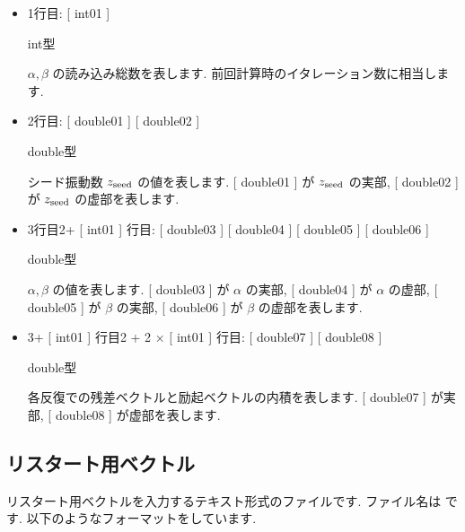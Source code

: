 \documentclass[letterpaper,10pt,dvipdfmx,openany]{sphinxmanual}
\begin{document}
\begin{sphinxVerbatim}[commandchars=\\\{\}]
 
    
   
 
 
\end{sphinxVerbatim}
\begin{itemize}
\item {} 
1行目: {[} int01 {]}

 int型

\(\alpha, \beta\) の読み込み総数を表します. 前回計算時のイタレーション数に相当します.

\item {} 
2行目: {[} double01 {]} {[} double02 {]}

 double型

 シード振動数 \(z_{\rm seed}\) の値を表します.
{[} double01 {]} が \(z_{\rm seed}\) の実部,
{[} double02 {]} が \(z_{\rm seed}\) の虚部を表します.

\item {} 
3行目\sphinxhyphen{}2+ {[} int01 {]} 行目:
{[} double03 {]} {[} double04 {]} {[} double05 {]} {[} double06 {]}

 double型

 \(\alpha, \beta\) の値を表します.
{[} double03 {]} が \(\alpha\) の実部, {[} double04 {]} が \(\alpha\) の虚部,
{[} double05 {]} が \(\beta\) の実部, {[} double06 {]} が \(\beta\) の虚部を表します.

\item {} 
3+ {[} int01 {]} 行目\sphinxhyphen{}2 + 2 \(\times\) {[} int01 {]} 行目:
{[} double07 {]} {[} double08 {]}

 double型

 各反復での残差ベクトルと励起ベクトルの内積を表します.
{[} double07 {]} が実部, {[} double08 {]} が虚部を表します.

\end{itemize}


\subsection{リスタート用ベクトル}
\label{\detokenize{shiftk_format_ja:revec}}\label{\detokenize{shiftk_format_ja:id5}}
リスタート用ベクトルを入力するテキスト形式のファイルです.
ファイル名は  です.
以下のようなフォーマットをしています.
\end{document}
